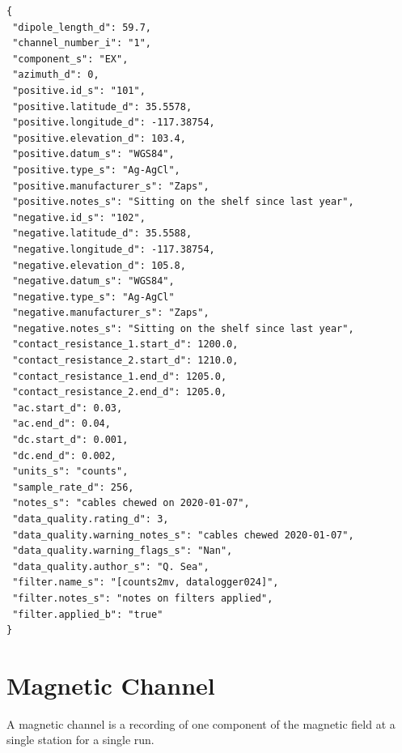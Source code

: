 \documentclass{article}
\begin{document}
\begin{verbatim}
{
 "dipole_length_d": 59.7,
 "channel_number_i": "1",
 "component_s": "EX",
 "azimuth_d": 0,
 "positive.id_s": "101",
 "positive.latitude_d": 35.5578,
 "positive.longitude_d": -117.38754,
 "positive.elevation_d": 103.4,
 "positive.datum_s": "WGS84",
 "positive.type_s": "Ag-AgCl",
 "positive.manufacturer_s": "Zaps",
 "positive.notes_s": "Sitting on the shelf since last year",
 "negative.id_s": "102",
 "negative.latitude_d": 35.5588,
 "negative.longitude_d": -117.38754,
 "negative.elevation_d": 105.8,
 "negative.datum_s": "WGS84",
 "negative.type_s": "Ag-AgCl"
 "negative.manufacturer_s": "Zaps",
 "negative.notes_s": "Sitting on the shelf since last year",
 "contact_resistance_1.start_d": 1200.0,
 "contact_resistance_2.start_d": 1210.0,
 "contact_resistance_1.end_d": 1205.0,
 "contact_resistance_2.end_d": 1205.0,
 "ac.start_d": 0.03,
 "ac.end_d": 0.04,
 "dc.start_d": 0.001,
 "dc.end_d": 0.002,
 "units_s": "counts",
 "sample_rate_d": 256,
 "notes_s": "cables chewed on 2020-01-07",
 "data_quality.rating_d": 3,
 "data_quality.warning_notes_s": "cables chewed 2020-01-07",
 "data_quality.warning_flags_s": "Nan",
 "data_quality.author_s": "Q. Sea",
 "filter.name_s": "[counts2mv, datalogger024]",
 "filter.notes_s": "notes on filters applied",
 "filter.applied_b": "true"
}
\end{verbatim}

\newpage
\section{Magnetic Channel}

A magnetic channel is a recording of one component of the magnetic field at a single station for a single run.
\end{document}
